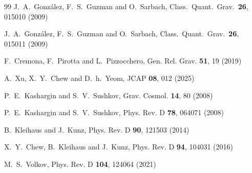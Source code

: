 \documentclass[11pt,a4paper]{article}
\begin{document}
\begin{thebibliography}{99}
  J.~A.~Gonz\'alez, F.~S.~Guzman and O.~Sarbach,
  Class.\ Quant.\ Grav.\  {\bf 26}, 015010 (2009)

  J.~A.~Gonz\'alez, F.~S.~Guzman and O.~Sarbach,
  Class.\ Quant.\ Grav.\  {\bf 26},  015011 (2009)

F.~Cremona, F.~Pirotta and L.~Pizzocchero,
Gen. Rel. Grav. \textbf{51}, 19 (2019)

A.~Xu, X.~Y.~Chew and D.~h.~Yeom,
JCAP \textbf{08}, 012 (2025)
 

  

P.~E.~Kashargin and S.~V.~Sushkov,
Grav. Cosmol. \textbf{14}, 80 (2008)

P.~E.~Kashargin and S.~V.~Sushkov,
Phys. Rev. D \textbf{78}, 064071 (2008)

B.~Kleihaus and J.~Kunz,
Phys. Rev. D \textbf{90}, 121503 (2014)

X.~Y.~Chew, B.~Kleihaus and J.~Kunz,
Phys. Rev. D \textbf{94}, 104031 (2016)

M.~S.~Volkov,
Phys. Rev. D \textbf{104}, 124064 (2021)



\end{thebibliography}
\end{document}
